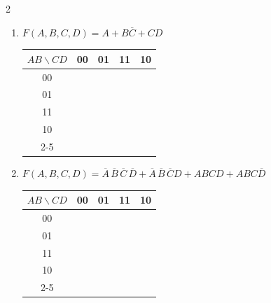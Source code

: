 \documentclass[12pt,a4paper]{article}
\begin{document}
\begin{multicols}{2}
\begin{enumerate}[label=\alph*)]
  \item \begin{minipage}[t]{\linewidth}
    $F(A,B,C,D) = A + B\overline{C} + CD$

    \begin{center}
      \begin{tabular}{c|c|c|c|c|}
        $AB \backslash CD$ & 00 & 01 & 11 & \multicolumn{1}{c}{10} \\
        \hline
        00 & \phantom{0} & \phantom{0} & \phantom{0} & \phantom{0} \\
        \hline
        01 & \phantom{0} & \phantom{0} & \phantom{0} & \phantom{0} \\
        \hline
        11 & \phantom{0} & \phantom{0} & \phantom{0} & \phantom{0} \\
        \hline
        10 & \phantom{0} & \phantom{0} & \phantom{0} & \phantom{0} \\
        \cline{2-5}
      \end{tabular}
    \end{center}
  \end{minipage}

  \item \begin{minipage}[t]{\linewidth}
    {\small $F(A,B,C,D) = \overline{A}\,\overline{B}\,\overline{C}\,\overline{D} + \overline{A}\,\overline{B}\,\overline{C}D + ABCD + ABC\overline{D}$}

    \begin{center}
      \begin{tabular}{c|c|c|c|c|}
        $AB \backslash CD$ & 00 & 01 & 11 & \multicolumn{1}{c}{10} \\
        \hline
        00 & \phantom{0} & \phantom{0} & \phantom{0} & \phantom{0} \\
        \hline
        01 & \phantom{0} & \phantom{0} & \phantom{0} & \phantom{0} \\
        \hline
        11 & \phantom{0} & \phantom{0} & \phantom{0} & \phantom{0} \\
        \hline
        10 & \phantom{0} & \phantom{0} & \phantom{0} & \phantom{0} \\
        \cline{2-5}
      \end{tabular}
    \end{center}
  \end{minipage}


\end{enumerate}
\end{multicols}
\end{document}

